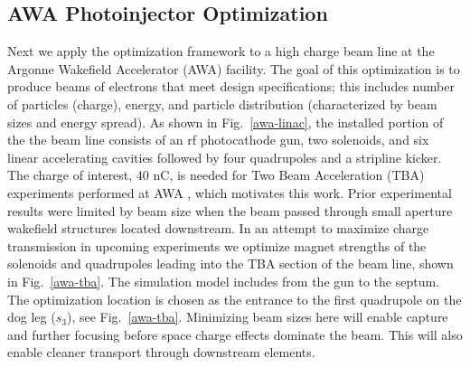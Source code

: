 \subsection{AWA Photoinjector Optimization} \label{awaproblem}
Next we apply the optimization framework to a high charge beam line
 at the Argonne Wakefield Accelerator (AWA) facility. 
The goal of this optimization is to produce beams of electrons that meet 
design specifications; this includes number of particles (charge), energy, and particle distribution (characterized by beam sizes and energy spread).
As shown in Fig.~\ref{awa-linac}, the installed portion of the the 
beam line consists of an rf photocathode gun, 
two solenoids, and six linear accelerating cavities
followed by four quadrupoles and a stripline kicker. 
The charge of interest, 40 nC, is needed for Two Beam 
Acceleration (TBA) 
experiments performed at AWA \cite{gai_power_jing_2012,JING201872}, 
which motivates this work. 
Prior experimental results were limited by beam size when the beam passed through small aperture 
wakefield structures located downstream. 
In an attempt to maximize charge transmission in upcoming experiments
we optimize magnet strengths of the solenoids and quadrupoles leading into the 
TBA section of the beam line, shown in Fig.~\ref{awa-tba}.
The simulation model includes from the gun to the septum.
The optimization location is chosen as the  
entrance to the first quadrupole on the dog leg ($s_3$), see Fig.~\ref{awa-tba}.
Minimizing beam sizes here will enable capture and further focusing before space charge effects dominate the beam. 
This will also enable cleaner transport through downstream elements.

